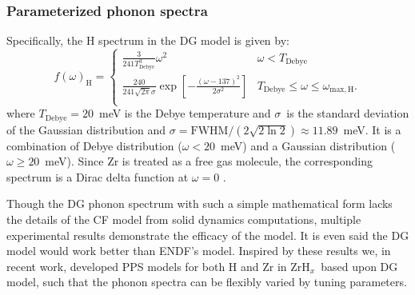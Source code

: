 \documentclass[review]{elsarticle}
\newcommand{\zh}{ZrH$_x$}
\newcommand{\tcb}[1]{{#1}}
\begin{document}
\subsubsection*{Parameterized phonon spectra}
\tcb{Specifically, the H spectrum in the DG model is given by:
\begin{equation}\label{eq:dg}
f(\omega)_\mathrm{H}=
\begin{cases}
\frac{3}{241T_\mathrm{Debye}^3}\omega^2 & \omega<T_\mathrm{Debye}\\
\frac{240}{241\sqrt{2\pi}\sigma}\exp\left[-\frac{(\omega-137)^2}{2\sigma^2}\right]& T_\mathrm{Debye}\leq\omega\leq\omega_\mathrm{max, H}.\\
\end{cases}
\end{equation}
where $T_\mathrm{Debye}=20$\ meV is the Debye temperature and $\sigma$\ is the standard deviation of the Gaussian distribution and $\sigma=\mathrm{FWHM}/(2\sqrt{2\ln 2})\approx11.89$\ meV. It is a combination of Debye distribution ($\omega<20$\ meV) and a Gaussian distribution ($\omega\geq 20$\ meV). Since Zr is treated as a free gas molecule, the corresponding spectrum is a Dirac delta function at $\omega=0$ \cite{Macf}.}

Though the DG phonon spectrum with such a simple mathematical form lacks the details of {the CF model} from solid dynamics computations, multiple experimental results demonstrate the efficacy of the model\cite{IKE}. It is even said the DG model would work better than ENDF's model\cite{IKE}. Inspired by these results we, in recent work, developed PPS models for both H and Zr in \zh~based upon DG model\cite{weixiong,thesis,physor}, such that the phonon spectra can be flexibly varied by tuning parameters.
\end{document}
